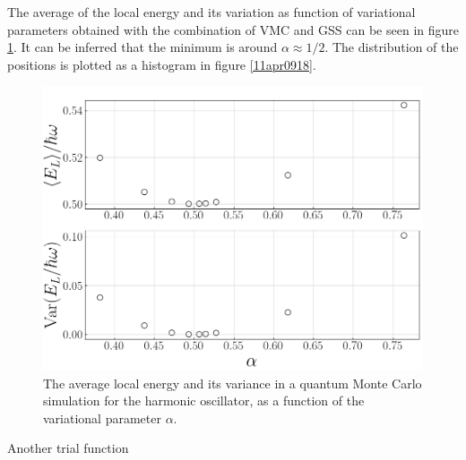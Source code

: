 \documentclass[twocolumn]{article}
\begin{document}
\begin{large}
The average of the local energy and its variation as function of variational parameters obtained with the combination of VMC and GSS can be seen in figure \ref{10apr1617}. It can be inferred that the minimum is around $\alpha\approx 1/2$. The distribution of the positions is plotted as a histogram in figure \ref{11apr0918}. 
\begin{figure}[t!]
    \includegraphics[scale=0.35]{ParamsEnergyHarOsc.png}
    \caption{The average local energy and its variance in a quantum Monte Carlo simulation for the harmonic oscillator, as a function of the variational parameter $\alpha$.}
    \label{10apr1617}
\end{figure}

Another trial function



\end{large}
\end{document}
